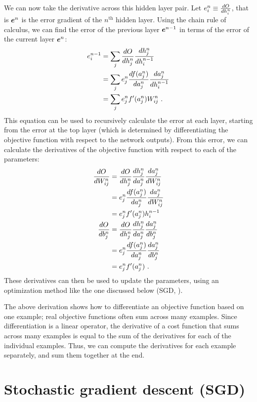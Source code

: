 We can now take the derivative across this hidden layer pair.
Let $e_i^n \equiv \frac{dO}{dh_i^n}$, that is $\boldsymbol{e}^n$
is the error gradient of the $n^\text{th}$ hidden layer.
Using the chain rule of calculus,
we can find the error of the previous layer $\boldsymbol{e}^{n-1}$
in terms of the error of the current layer $\boldsymbol{e}^n$:
\begin{align}
  e_i^{n-1} &= \sum_j \frac{dO}{dh_j^n} \frac{dh_j^n}{dh_i^{n-1}} \nonumber\\
           &= \sum_j e_j^n \frac{df(a_j^n)}{da_j^n} \frac{da_j^n}{dh_i^{n-1}} \nonumber\\
           &= \sum_j e_j^n f'(a_j^n) W_{ij}^n \text{ .}
\end{align}
This equation can be used to recursively calculate the error at each layer,
starting from the error at the top layer
(which is determined by differentiating the objective function
with respect to the network outputs).
From this error, we can calculate the derivatives of the objective function
with respect to each of the parameters:
\begin{align}
  \frac{dO}{dW_{ij}^n} &= \frac{dO}{dh_j^n} \frac{dh_j^n}{da_j^n} \frac{da_j^n}{dW_{ij}^n} \nonumber\\
                    &= e_j^n \frac{df(a_j^n)}{da_j^n} \frac{da_j^n}{dW_{ij}^n} \nonumber\\
                    &= e_j^n f'(a_j^n) h_i^{n-1} \\
  \frac{dO}{db_j^n} &= \frac{dO}{dh_j^n} \frac{dh_j^n}{da_j^n} \frac{da_j^n}{db_j^n} \nonumber\\
                  &= e_j^n \frac{df(a_j^n)}{da_j^n} \frac{da_j^n}{db_j^n} \nonumber\\
                  &= e_j^n f'(a_j^n) \text{ .}
\end{align}
These derivatives can then be used to update the parameters,
using an optimization method like the one discussed below (SGD, ).

The above derivation shows how to differentiate an objective function
based on one example;
real objective functions often sum across many examples.
Since differentiation is a linear operator,
the derivative of a cost function that sums across many examples
is equal to the sum of the derivatives for each of the individual examples.
Thus, we can compute the derivatives for each example separately,
and sum them together at the end.


\section{Stochastic gradient descent (SGD)}

